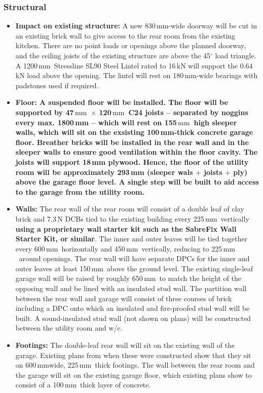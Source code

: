 \documentclass{extension}
\newcommand{\mm}{\,$\mathrm{mm}$}
\begin{document}
\subsubsection{Structural}
\begin{itemize}
  \item {\bf Impact on existing structure:} A new 830\mm -wide doorway will be cut in an existing brick wall to give access to the rear room from the existing kitchen. There are no point loads or openings above the planned doorway, and the ceiling joists of the existing structure are above the 45$^\circ$ load triangle. A 1200\mm\ Stressline SL90 Steel Lintel rated to 16\,kN will support the 0.64\,kN load above the opening. The lintel will rest on 180\mm -wide bearings with padstones used if required.
  \item {\bf Floor:} {\bf A suspended floor will be installed. The floor will be supported by 47\mm\ $\times$ 120\mm\ C24 joists -- separated by noggins every max. 1800\,mm -- which will rest on 155\mm\ high sleeper walls, which will sit on the exsisting 100\,mm-thick concrete garage floor. Breather bricks will be installed in the rear wall and in the sleeper walls to ensure good ventilation within the floor cavity. The joists will support 18\,mm plywood. Hence, the floor of the utility room will be approximately 293\,mm (sleeper wals $+$ joists $+$ ply) above the garage floor level. A single step will be built to aid access to the garage from the utility room.}
  \item {\bf Walls:} The rear wall of the rear room will consist of a double leaf of clay brick and 7.3\,N DCBs tied to the existing building every 225\mm\ vertically {\bf using a proprietary wall starter kit such as the SabreFix Wall Starter Kit, or similar}.\cite{starterkit} The inner and outer leaves will be tied together every 600\mm\ horizontally and 450\mm\ vertically, reducing to 225\mm\ around openings. The rear wall will have separate DPCs for the inner and outer leaves at least 150\mm\ above the ground level. The existing single-leaf garage wall will be raised by roughly 650\mm\ to match the height of the opposing wall and be lined with an insulated stud wall. The partition wall between the rear wall and garage will consist of three courses of brick including a DPC onto which an insulated and fire-proofed stud wall will be built. A sound-insulated stud wall (not shown on plans) will be constructed between the utility room and w/c.
  \item {\bf Footings:} The double-leaf rear wall will sit on the existing wall of the garage. Existing plans from when these were constructed show that they sit on 600\mm wide, 225\mm\ thick footings. The wall between the rear room and the garage will sit on the existing garage floor, which existing plans show to consist of a 100\mm\ thick layer of concrete.

\end{itemize}
\end{document}
